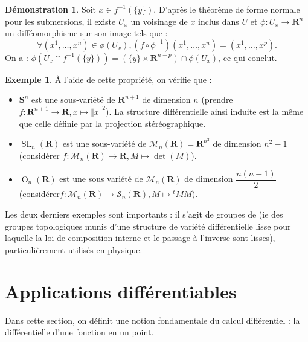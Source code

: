 \documentclass[12pt,a4paper]{article}
\DeclareMathOperator{\SL}{SL}
\DeclareMathOperator{\Or}{O}
\theoremstyle{definition}
\newtheorem{ex}[thm]{Exemple}
\newtheorem*{dem}{Démonstration}
\begin{document}
\begin{dem}
Soit $x\in f^{-1}(\{y\})$. D'après le théorème de forme normale pour les submersions, il existe $U_x$ un voisinage de $x$ inclus dans $U$ et $\phi:U_x\to\mathbf{R}^n$ un difféomorphisme sur son image tels que :
$$
\forall (x^1,\ldots,x^n)\in\phi(U_x), \left(f\circ\phi^{-1}\right)(x^1,\ldots,x^n)=(x^1,\ldots,x^p).
$$
On a : $\phi(U_x\cap f^{-1}(\{y\}))=(\{y\}\times\mathbf{R}^{n-p})\cap\phi(U_x)$, ce qui conclut.
\end{dem}
\begin{ex}
À l'aide de cette propriété, on vérifie que :
\begin{itemize}
\item $\mathbf{S}^n$ est une sous-variété de $\mathbf{R}^{n+1}$ de dimension $n$ (prendre $f:\mathbf{R}^{n+1}\to\mathbf{R},x\mapsto\Vert x\Vert^2$). La structure différentielle ainsi induite est la même que celle définie par la projection stéréographique.
\item $\SL_n(\mathbf{R})$ est une sous-variété de $\mathcal{M}_n(\mathbf{R})=\mathbf{R}^{n^2}$ de dimension $n^2-1$ (considérer $f:\mathcal{M}_n(\mathbf{R})\to\mathbf{R}, M\mapsto\det(M)$).
\item $\Or_n(\mathbf{R})$ est une sous variété de $\mathcal{M}_n(\mathbf{R})$ de dimension $\dfrac{n(n-1)}{2}$ (considérer\newline $f:\mathcal{M}_n(\mathbf{R})\to\mathcal{S}_n(\mathbf{R}),M\mapsto {}^tMM$).
\end{itemize}
Les deux derniers exemples sont importants : il s'agit de groupes de  (ie des groupes topologiques munis d'une structure de variété différentielle lisse pour laquelle la loi de composition interne et le passage à l'inverse sont lisses), particulièrement utilisés en physique.
\end{ex}
\newpage
\section{Applications différentiables}
Dans cette section, on définit une notion fondamentale du calcul différentiel : la différentielle d'une fonction en un point.

\medskip
\end{document}
